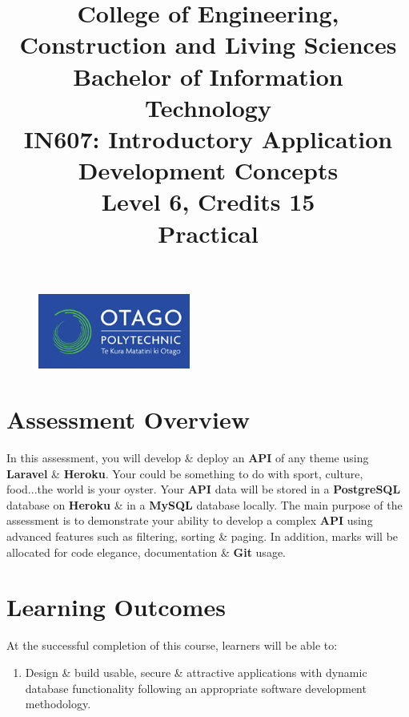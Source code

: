 \documentclass{article}
\author{}
\begin{document}
\begin{figure}
	\centering
	\includegraphics[width=50mm]{./img/logo.png}
\end{figure}

\title{College of Engineering, Construction and Living Sciences\\Bachelor of Information Technology\\IN607: Introductory Application Development Concepts\\Level 6, Credits 15\\\textbf{Practical}}
\date{}
\maketitle

\section*{Assessment Overview}
In this assessment, you will develop \& deploy an \textbf{API} of any theme using \textbf{Laravel} \& \textbf{Heroku}. Your could be something to do with sport, culture, food...the world is your oyster. Your \textbf{API} data will be stored in a \textbf{PostgreSQL} database on \textbf{Heroku} \& in a \textbf{MySQL} database locally. The main purpose of the assessment is to demonstrate your ability to develop a complex \textbf{API} using advanced features such as filtering, sorting \& paging. In addition, marks will be allocated for code elegance, documentation \& \textbf{Git} usage. 

\section*{Learning Outcomes}
At the successful completion of this course, learners will be able to:
\begin{enumerate}
	\item Design \& build usable, secure \& attractive applications with dynamic database functionality following an appropriate software development methodology.
\end{enumerate}
\end{document}
